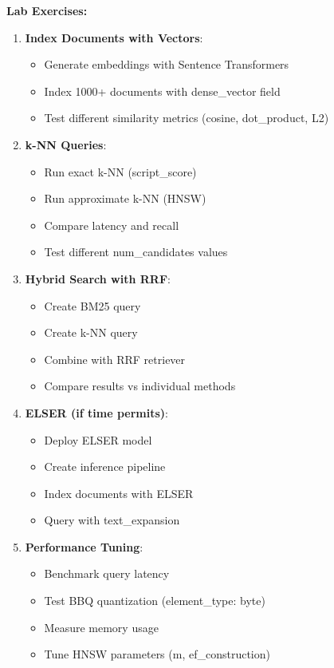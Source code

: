 \documentclass[10pt]{article}
\begin{document}
\textbf{Lab Exercises:}
\begin{enumerate}
\item \textbf{Index Documents with Vectors}:
  \begin{itemize}
  \item Generate embeddings with Sentence Transformers
  \item Index 1000+ documents with dense\_vector field
  \item Test different similarity metrics (cosine, dot\_product, L2)
  \end{itemize}

\item \textbf{k-NN Queries}:
  \begin{itemize}
  \item Run exact k-NN (script\_score)
  \item Run approximate k-NN (HNSW)
  \item Compare latency and recall
  \item Test different num\_candidates values
  \end{itemize}

\item \textbf{Hybrid Search with RRF}:
  \begin{itemize}
  \item Create BM25 query
  \item Create k-NN query
  \item Combine with RRF retriever
  \item Compare results vs individual methods
  \end{itemize}

\item \textbf{ELSER (if time permits)}:
  \begin{itemize}
  \item Deploy ELSER model
  \item Create inference pipeline
  \item Index documents with ELSER
  \item Query with text\_expansion
  \end{itemize}

\item \textbf{Performance Tuning}:
  \begin{itemize}
  \item Benchmark query latency
  \item Test BBQ quantization (element\_type: byte)
  \item Measure memory usage
  \item Tune HNSW parameters (m, ef\_construction)
  \end{itemize}
\end{enumerate}
\end{document}
